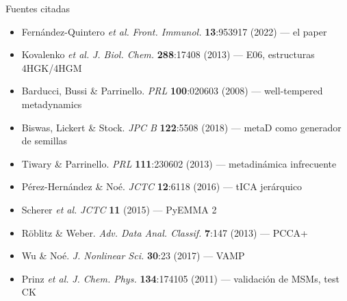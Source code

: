 \documentclass[aspectratio=169,11pt]{beamer}
\begin{document}
\begin{frame}{Fuentes citadas}
  \scriptsize
  \begin{itemize}
    \item Fernández-Quintero \textit{et al.} \textit{Front. Immunol.} \textbf{13}:953917 (2022) — el paper
    \item Kovalenko \textit{et al.} \textit{J. Biol. Chem.} \textbf{288}:17408 (2013) — E06, estructuras 4HGK/4HGM
    \item Barducci, Bussi \& Parrinello. \textit{PRL} \textbf{100}:020603 (2008) — well-tempered metadynamics
    \item Biswas, Lickert \& Stock. \textit{JPC B} \textbf{122}:5508 (2018) — metaD como generador de semillas
    \item Tiwary \& Parrinello. \textit{PRL} \textbf{111}:230602 (2013) — metadinámica infrecuente
    \item Pérez-Hernández \& Noé. \textit{JCTC} \textbf{12}:6118 (2016) — tICA jerárquico
    \item Scherer \textit{et al.} \textit{JCTC} \textbf{11} (2015) — PyEMMA 2
    \item Röblitz \& Weber. \textit{Adv. Data Anal. Classif.} \textbf{7}:147 (2013) — PCCA+
    \item Wu \& Noé. \textit{J. Nonlinear Sci.} \textbf{30}:23 (2017) — VAMP
    \item Prinz \textit{et al.} \textit{J. Chem. Phys.} \textbf{134}:174105 (2011) — validación de MSMs, test CK
  \end{itemize}
\end{frame}
\end{document}
